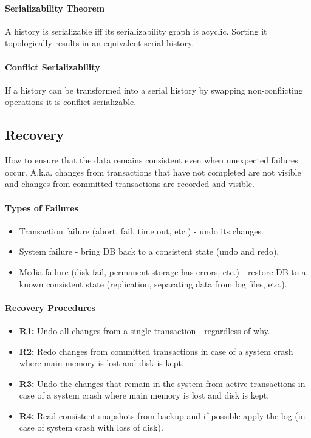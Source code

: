 \paragraph{Serializability Theorem}
A history is serializable iff its serializability graph is acyclic. Sorting it topologically results in an equivalent serial history.

\paragraph{Conflict Serializability}
If a history can be transformed into a serial history by swapping non-conflicting operations it is conflict serializable.



\subsection{Recovery}

How to ensure that the data remains consistent even when unexpected failures occur. A.k.a. changes from transactions that have not completed are not visible and changes from committed transactions are recorded and visible.

\paragraph{Types of Failures}
\begin{itemize}
    \item Transaction failure (abort, fail, time out, etc.) - undo its changes.
    \item System failure - bring DB back to a consistent state (undo and redo).
    \item Media failure (disk fail, permanent storage has errors, etc.) - restore DB to a known consistent state (replication, separating data from log files, etc.).
\end{itemize}

\paragraph{Recovery Procedures}
\begin{itemize}
    \item \textbf{R1:} Undo all changes from a single transaction - regardless of why.
    \item \textbf{R2:} Redo changes from committed transactions in case of a system crash where main memory is lost and disk is kept.
    \item \textbf{R3:} Undo the changes that remain in the system from active transactions in case of a system crash where main memory is lost and disk is kept.
    \item \textbf{R4:} Read consistent snapshots from backup and if possible apply the log (in case of system crash with loss of disk).
\end{itemize}

